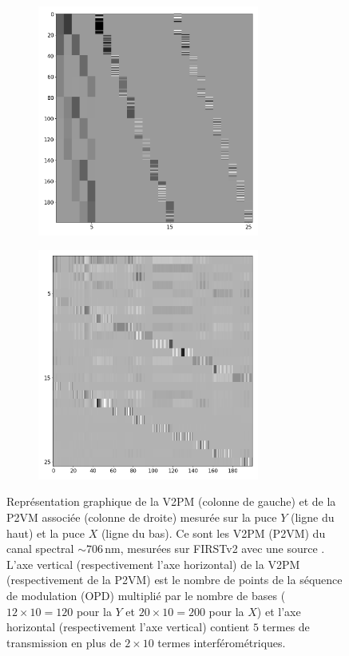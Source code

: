 \begin{figure}[ht!]
    \begin{subfigure}{0.5\textwidth}
        \centering
        \includegraphics[width=0.8\textwidth]{Figure_Chap3/20220811_V2PM_Pola1_706nm.png}
    \end{subfigure}%
    \begin{subfigure}{0.5\textwidth}
        \centering
        \includegraphics[width=0.8\textwidth]{Figure_Chap3/20220811_P2VM_Pola1_706nm.png}
    \end{subfigure}
    \caption[Représentation graphique de la V2PM et de sa P2VM mesurée sur FIRSTv2, pour les deux puces.]{Représentation graphique de la V2PM (colonne de gauche) et de la P2VM associée (colonne de droite) mesurée sur la puce $Y$ (ligne du haut) et la puce $X$ (ligne du bas). Ce sont les V2PM (P2VM) du canal spectral $\sim 706 \,$nm, mesurées sur FIRSTv2 avec une source \sk. L'axe vertical (respectivement l'axe horizontal) de la V2PM (respectivement de la P2VM) est le nombre de points de la séquence de modulation (OPD) multiplié par le nombre de bases ($12 \times 10 = 120$ pour la $Y$ et $20 \times 10 = 200$ pour la $X$) et l'axe horizontal (respectivement l'axe vertical) contient $5$ termes de transmission en plus de $2 \times 10$ termes interférométriques.}

\end{figure}
